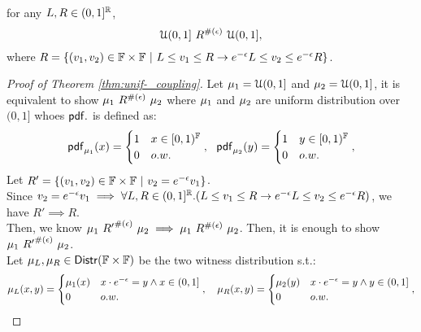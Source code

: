 \documentclass[a4paper,11pt]{article}
\begin{document}
%
%
\begin{thm}
\label{thm:unif-_coupling}
for any $L, R \in (0,1]^{\mathbb{R}}$, 
%
$${\mathcal{U}(0,1]} ~ R^{\#(\epsilon)} ~ {\mathcal{U}(0,1]},$$
%
where
	$	R = 
		\left \{(v_1, v_2) \in {\mathbb{F}} \times {\mathbb{F}} 
		~|~
		L \leq v_1 \leq R
		\rightarrow
		e^{-\epsilon} L \leq v_2 \leq 	e^{-\epsilon} R
		\right \}
		$.
\end{thm}
%
\begin{proof}[Proof of Theorem \ref{thm:unif-_coupling}]
%
Let $\mu_1 = \mathcal{U}(0, 1]$ and $\mu_2 = \mathcal{U}(0, 1]$, it is equivalent to show 
${\mu_1} ~ R^{\#(\epsilon)} ~ \mu_2$
%
where $\mu_1$ and $\mu_2$ are uniform distribution over $(0, 1]$ whoes $\mathsf{pdf}.$ is defined as:
\[
	\mathsf{pdf}_{\mu_1}(x) = 
	\begin{cases}
	1 & x \in [0, 1)^{\mathbb{F}} 
	\\
	0       & o.w.
	\end{cases},
	~~
	\mathsf{pdf}_{\mu_2}(y) = 
	\begin{cases}
	1 & y \in [0, 1)^{\mathbb{F}}
	\\
	0       & o.w.
	\end{cases},
\]
%
Let $R' =
		\left \{(v_1, v_2) \in {\mathbb{F}} \times {\mathbb{F}} 
		~|~
		v_2 =  e^{-\epsilon}  v_1
		\right \}$.
\\
Since $v_2 = e^{-\epsilon} v_1 \implies 
\forall L, R \in (0,1]^{\mathbb{R}}. (
L \leq v_1 \leq R
\rightarrow
e^{-\epsilon} L \leq v_2 \leq 	e^{-\epsilon} R)$,
 we have $R' \implies R$.
%
\\
Then, we know ${\mu_1} ~ {R'}^{\#(\epsilon)} ~ \mu_2
\implies {\mu_1} ~ R^{\#(\epsilon)} ~ \mu_2$.
Then, it is enough to show ${\mu_1} ~ {R'}^{\#(\epsilon)} ~ \mu_2$.
%
\\
%
Let $\mu_L, \mu_R \in \mathsf{Distr}(\mathbb{F} \times \mathbb{F})$ 
be the two witness distribution s.t.:
\[
	{\mu_L}(x, y) = 
	\begin{cases}
	\mu_1(x)
	& x \cdot e^{-\epsilon} = y  \land x \in (0, 1]\\
	0       & o.w.
	\end{cases},
~~~
	{\mu_R}(x, y) = 
	\begin{cases}
	\mu_2(y)
	& x \cdot e^{-\epsilon} = y \land y \in (0, 1]\\
	0       & o.w.
	\end{cases},
\]
\end{proof}
\end{document}

